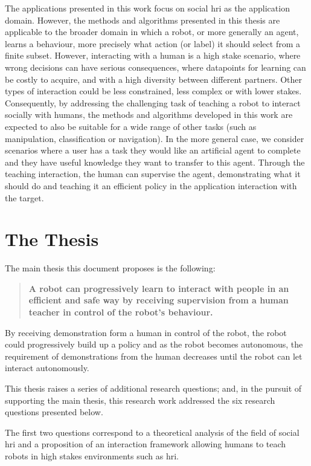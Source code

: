The applications presented in this work focus on social \gls{hri} as the application domain. However, the methods and algorithms presented in this thesis are applicable to the broader domain in which a robot, or more generally an agent, learns a behaviour, more precisely what action (or label) it should select from a finite subset. However, interacting with a human is a high stake scenario, where wrong decisions can have serious consequences, where datapoints for learning can be costly to acquire, and with a high diversity between different partners. Other types of interaction could be less constrained, less complex or with lower stakes. Consequently, by addressing the challenging task of teaching a robot to interact socially with humans, the methods and algorithms developed in this work are expected to also be suitable for a wide range of other tasks (such as manipulation, classification or navigation). In the more general case, we consider scenarios where a user has a task they would like an artificial agent to complete and they have useful knowledge they want to transfer to this agent. Through the teaching interaction, the human can supervise the agent, demonstrating what it should do and teaching it an efficient policy in the application interaction with the target. 

\section{The Thesis}\label{sec:intro_thesis}

The main thesis this document proposes is the following:
\begin{quote}
	\textbf{A robot can progressively learn to interact with people in an efficient and safe way by receiving supervision from a human teacher in control of the robot's behaviour.}
\end{quote}

By receiving demonstration form a human in control of the robot, the robot could progressively build up a policy and as the robot becomes autonomous, the requirement of demonstrations from the human decreases until the robot can let interact autonomously.

This thesis raises a series of additional research questions; and, in the pursuit of supporting the main thesis, this research work addressed the six research questions presented below.

The first two questions correspond to a theoretical analysis of the field of social \gls{hri} and a proposition of an interaction framework allowing humans to teach robots in high stakes environments such as \gls{hri}.

